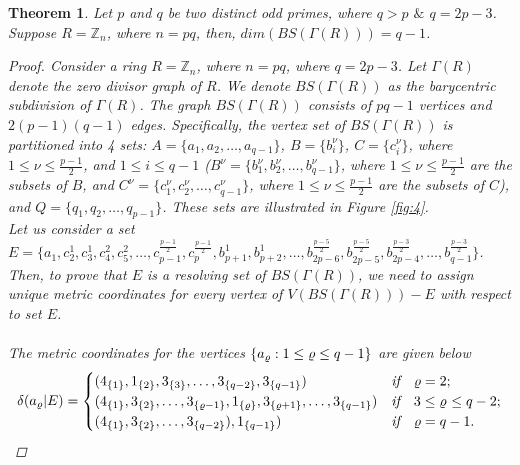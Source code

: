 \documentclass[]{interact}
\theoremstyle{plain}%
\newtheorem{theorem}{Theorem}[section]
\theoremstyle{definition}
\theoremstyle{remark}
\begin{document}
            \begin{theorem}\label{z}
Let $p$ and $q$ be two distinct odd primes, where $q>p$ $\&$ $q = 2p-3$. Suppose $R=\mathbb{Z}_n$, where $n=pq$, then,
$dim(BS(\Gamma(R))
)=q-1$.
\begin{proof}
Consider a ring $R = \mathbb{Z}_n$, where $n=pq$, where $q = 2p-3$. Let $\Gamma(R)$ denote the zero divisor graph of $R$. We denote $BS(\Gamma(R))$ as the barycentric subdivision of $\Gamma(R)$. The graph $BS(\Gamma(R))$ consists of $pq-1$ vertices and $2(p-1)(q-1)$ edges. Specifically, the vertex set of $BS(\Gamma(R))$ is partitioned into 4 sets: $A=\{a_1,a_2,\ldots, a_{q-1}\}$,  $B=\{b^\nu_i\}$, $C=\{c^\nu_i\}$, where $1\leq \nu\leq \frac{p-1}{2}$, and $1\leq i\leq {q-1}$ ($B^\nu=\{b^\nu_1,b^\nu_2,\ldots,b^\nu_{q-1}\}$, where $1\leq \nu \leq \frac{p-1}{2}$ are the subsets of $B$, and $C^\nu=\{c^\nu_1,c^\nu_2,\ldots,c^\nu_{q-1}\}$, where $1\leq \nu \leq \frac{p-1}{2}$  are the subsets of $C$), and $Q=\{q_1,q_2, \ldots, q_{p-1}\}$. These sets are illustrated in Figure \ref{fig:4}.\\

 \noindent Let us consider a set $E=\{   a _1, c^1_2,c^1_3,c^2_4,c^2_5,\ldots,c^\frac{p-1}{2}_{p-1},c^\frac{p-1}{2}_{p}, b^1_{p+1}, b^1_{p+2},\ldots, b^\frac{p-5}{2}_{2p-6},b^\frac{p-5}{2}_{2p-5},b^\frac{p-3}{2}_{2p-4},\ldots,b^\frac{p-3}{2}_{q-1}\}$. 
Then, to prove that $E$  is a resolving set of $BS(\Gamma(R))$, we need to assign unique metric coordinates for every vertex of $V(BS(\Gamma(R)))-E$ with respect to set $E$. \\\\
 The metric coordinates for the vertices $\{a_ \varrho:1\leq \noindent \varrho\leq q-1\}$ are given below
 \begin{equation*}
               \delta(a_{\varrho}|E)=
                   \begin{cases}
                   (4_{\{1\}},1_{\{ 2 \}},3_{\{3\}},\ldots,3_{\{q-2\}},3_{\{q-1\}}) &\textit{if}\quad \varrho =2  ;\\
                    (4_{\{1\}},3_{\{2\}},\ldots,3_{\{\varrho -1\}},1_{\{ \varrho \}},3_{\{\varrho +1\}},\ldots,3_{\{q-1\}}) &\textit{if}\quad 3\leq \varrho $ $\leq q-2  ;\\
                    (4_{\{1\}},3_{\{2\}},\ldots, 3_{\{q-2\}}),1_{\{q-1\}}) &\textit{if}\quad  \varrho = q-1  .\\
                    \end{cases}
                     \end{equation*}
                     

\end{proof}
\end{theorem}
\end{document}
